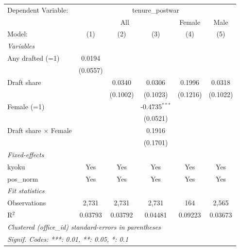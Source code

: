 \begingroup
\centering
\begin{tabular}{lccccc}
   \tabularnewline \midrule \midrule
   Dependent Variable: & \multicolumn{5}{c}{tenure\_postwar}\\
    & \multicolumn{3}{c}{All} & Female & Male \\ 
   Model:                       & (1)      & (2)      & (3)             & (4)      & (5)\\  
   \midrule
   \emph{Variables}\\
   Any drafted (=1)             & 0.0194   &          &                 &          &   \\   
                                & (0.0557) &          &                 &          &   \\   
   Draft share                  &          & 0.0340   & 0.0306          & 0.1996   & 0.0318\\   
                                &          & (0.1002) & (0.1023)        & (0.1216) & (0.1022)\\   
   Female (=1)                  &          &          & -0.4735$^{***}$ &          &   \\   
                                &          &          & (0.0521)        &          &   \\   
   Draft share $\times$ Female  &          &          & 0.1916          &          &   \\   
                                &          &          & (0.1701)        &          &   \\   
   \midrule
   \emph{Fixed-effects}\\
   kyoku                        & Yes      & Yes      & Yes             & Yes      & Yes\\  
   pos\_norm                    & Yes      & Yes      & Yes             & Yes      & Yes\\  
   \midrule
   \emph{Fit statistics}\\
   Observations                 & 2,731    & 2,731    & 2,731           & 164      & 2,565\\  
   R$^2$                        & 0.03793  & 0.03792  & 0.04481         & 0.09223  & 0.03673\\  
   \midrule \midrule
   \multicolumn{6}{l}{\emph{Clustered (office\_id) standard-errors in parentheses}}\\
   \multicolumn{6}{l}{\emph{Signif. Codes: ***: 0.01, **: 0.05, *: 0.1}}\\
\end{tabular}
\par\endgroup
